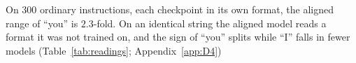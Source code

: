 On $300$ ordinary instructions, each checkpoint in its own format, the aligned range of ``you'' is $2.3$-fold. On an identical string the aligned model reads a format it was not trained on, and the sign of ``you'' splits while ``I'' falls in fewer models (Table~\ref{tab:readings}; Appendix~\ref{app:D4})